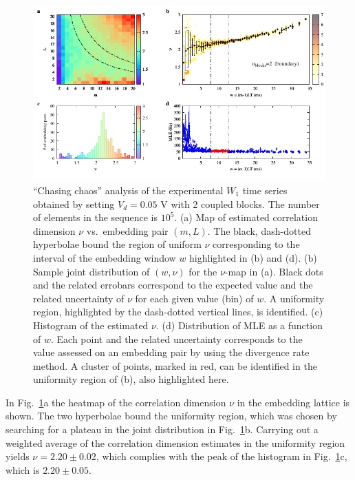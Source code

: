 \begin{figure}[h!]
    \centering
    \includegraphics[width=\linewidth]{../blocks/2_blocks/1e5_points/plots/chaos.pdf}
    \caption{``Chasing chaos'' analysis of the experimental $W_1$ time series
    obtained by setting $V_d=0.05$ V with 2 coupled blocks.
    The number of elements in the sequence is $10^5$.
    (a) Map of estimated correlation dimension $\nu$ vs.\ embedding pair $(m, L)$.
    The black, dash-dotted hyperbolae bound the region of uniform $\nu$ corresponding to the interval of the
    embedding window $w$ highlighted in (b) and (d).
    (b) Sample joint distribution of $(w,\nu)$ for the $\nu$-map in (a).
    Black dots and the related errobars correspond to the expected value and the related uncertainty of $\nu$
    for each given value (bin) of $w$. A uniformity region, highlighted by the dash-dotted vertical lines,
    is identified. (c) Histogram of the estimated $\nu$. (d) Distribution of MLE as a function of $w$. Each point and the related
    uncertainty corresponds to the value assessed on an embedding pair by using the divergence rate method.
    A cluster of points, marked in red, can be identified in the uniformity region of (b), also highlighted here.
    }\label{fig:2 blocks chaos}
\end{figure}

In Fig.~\ref{fig:2 blocks chaos}a the heatmap of the correlation dimension $\nu$ in the embedding
lattice is shown. The two hyperbolae bound the uniformity region, which was chosen by searching for
a plateau in the joint distribution in Fig.~\ref{fig:2 blocks chaos}b.
Carrying out a weighted average of the correlation dimension estimates in the uniformity region yields
$\nu=2.20\pm0.02$, which complies with the peak of the histogram in Fig.~\ref{fig:2 blocks chaos}c,
which is $2.20\pm0.05$.


